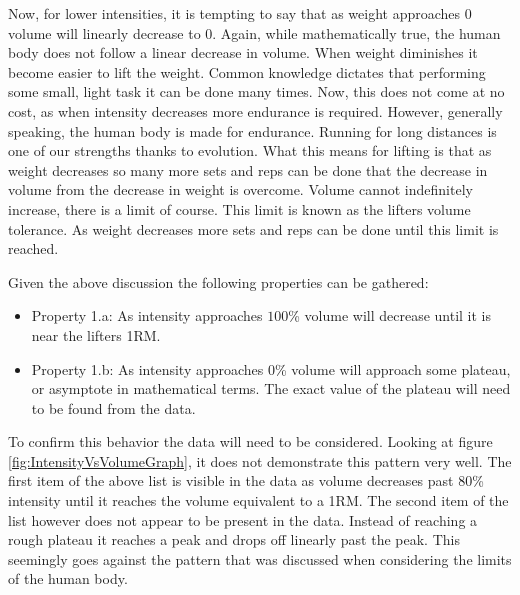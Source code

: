 Now, for lower intensities, it is tempting to say that as weight approaches $0$ volume will linearly decrease to $0$. Again, while mathematically true, the human body does not follow a linear decrease in volume. When weight diminishes it become easier to lift the weight. Common knowledge dictates that performing some small, light task it can be done many times. Now, this does not come at no cost, as when intensity decreases more endurance is required. However, generally speaking, the human body is made for endurance. Running for long distances is one of our strengths thanks to evolution. What this means for lifting is that as weight decreases so many more sets and reps can be done that the decrease in volume from the decrease in weight is overcome. Volume cannot indefinitely increase, there is a limit of course. This limit is known as the lifters volume tolerance. As weight decreases more sets and reps can be done until this limit is reached.

Given the above discussion the following properties can be gathered:

\begin{itemize}
	\item Property 1.a:  As intensity approaches $100$\%  volume will decrease until it is near the lifters 1RM.
	\item Property 1.b: As intensity approaches $0$\% volume will approach some plateau, or asymptote in mathematical terms. The exact value of the plateau will need to be found from the data.
\end{itemize}

To confirm this behavior the data will need to be considered. Looking at figure \ref{fig:IntensityVsVolumeGraph}, it does not demonstrate this pattern very well. The first item of the above list is visible in the data as volume decreases past $80$\% intensity until it reaches the volume equivalent to a 1RM. The second item of the list however does not appear to be present in the data. Instead of reaching a rough plateau it reaches a peak and drops off linearly past the peak. This seemingly goes against the pattern that was discussed when considering the limits of the human body.

